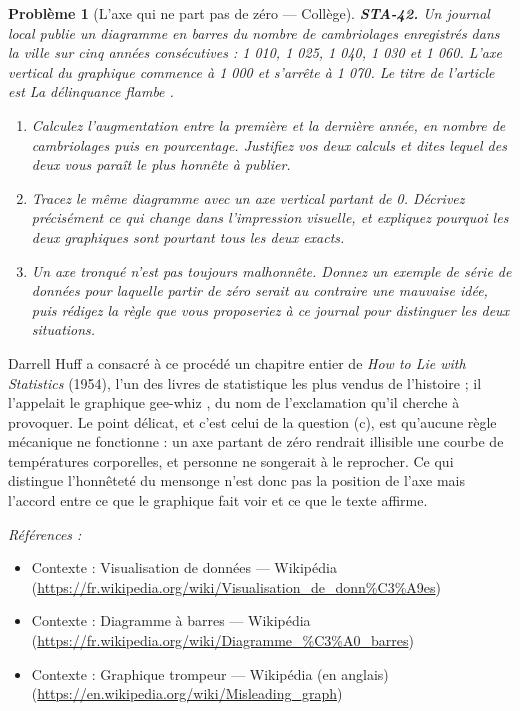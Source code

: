\documentclass[11pt]{article}
\newtheorem{problem}{Problème}
\newenvironment{refs}{\par\small\noindent\emph{Références :}\begin{itemize}\setlength\itemsep{0pt}}{\end{itemize}\normalsize}
\begin{document}
\bigskip

\begin{problem}[{L'axe qui ne part pas de zéro --- Collège}]
\textbf{STA-42.} Un journal local publie un diagramme en barres du nombre de cambriolages
enregistrés dans la ville sur cinq années consécutives : 1 010, 1 025, 1 040, 1 030 et 1 060.
L'axe vertical du graphique commence à 1 000 et s'arrête à 1 070. Le titre de l'article est \og{} La
délinquance flambe \fg{}.
\begin{enumerate}
\item[(a)] Calculez l'augmentation entre la première et la dernière année, en nombre de cambriolages puis
en pourcentage. Justifiez vos deux calculs et dites lequel des deux vous paraît le plus honnête à
publier.
\item[(b)] Tracez le même diagramme avec un axe vertical partant de 0. Décrivez précisément ce qui change
dans l'impression visuelle, et expliquez pourquoi les deux graphiques sont pourtant tous les deux
exacts.
\item[(c)] Un axe tronqué n'est pas toujours malhonnête. Donnez un exemple de série de données pour
laquelle partir de zéro serait au contraire une mauvaise idée, puis rédigez la règle que vous
proposeriez à ce journal pour distinguer les deux situations.
\end{enumerate}

\end{problem}

\noindent Darrell Huff a consacré à ce procédé un chapitre entier de \textit{How to Lie with
Statistics} (1954), l'un des livres de statistique les plus vendus de l'histoire ; il l'appelait
le graphique \og{} gee-whiz \fg{}, du nom de l'exclamation qu'il cherche à provoquer. Le point délicat, et
c'est celui de la question (c), est qu'aucune règle mécanique ne fonctionne : un axe partant de
zéro rendrait illisible une courbe de températures corporelles, et personne ne songerait à le
reprocher. Ce qui distingue l'honnêteté du mensonge n'est donc pas la position de l'axe mais
l'accord entre ce que le graphique fait voir et ce que le texte affirme.

\begin{refs}
\item Contexte : Visualisation de données --- Wikipédia (\url{https://fr.wikipedia.org/wiki/Visualisation_de_donn%C3%A9es})
\item Contexte : Diagramme à barres --- Wikipédia (\url{https://fr.wikipedia.org/wiki/Diagramme_%C3%A0_barres})
\item Contexte : Graphique trompeur --- Wikipédia (en anglais) (\url{https://en.wikipedia.org/wiki/Misleading_graph})
\end{refs}
\end{document}
